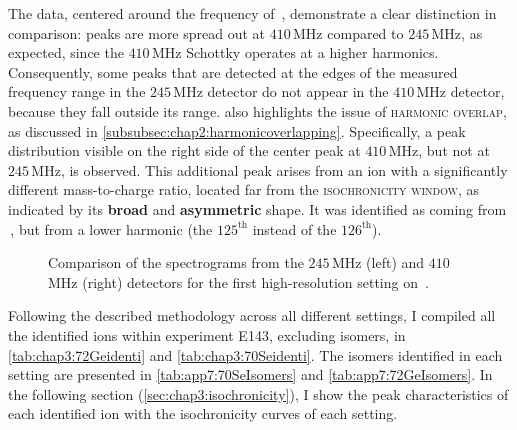 The data, centered around the frequency of \,, demonstrate a clear distinction in comparison: peaks are more spread out at $410$\,MHz compared to $245$\,MHz, as expected, since the $410$\,MHz Schottky operates at a higher harmonics. Consequently, some peaks that are detected at the edges of the measured frequency range in the $245$\,MHz detector do not appear in the $410$\,MHz detector, because they fall outside its range. 
 also highlights the issue of \textsc{harmonic overlap}, as discussed in \cref{subsubsec:chap2:harmonicoverlapping}.
Specifically, a peak distribution visible on the right side of the center peak at $410$\,MHz, but not at $245$\,MHz, is observed. This additional peak arises from an ion with a significantly different mass-to-charge ratio, located far from the \textsc{isochronicity window}, as indicated by its \textbf{broad} and \textbf{asymmetric} shape. It was identified as coming from \,, but from a lower harmonic (the $125^{\mathrm{th}}$ instead of the $126^{\mathrm{th}}$).

\begin{figure}[hbt]
  \centering
  \hspace{0.1cm}
  \caption{Comparison of the spectrograms from the $245$\,MHz (left) and $410$\,MHz (right) detectors for the first high-resolution setting on \,.}
  \label{fig:chap3:410vs245sum}
\end{figure}

Following the described methodology across all different settings, I compiled all the identified ions within experiment \textsc{E143}, excluding isomers, in \cref{tab:chap3:72Geidenti} and \cref{tab:chap3:70Seidenti}. The isomers identified in each setting are presented in \cref{tab:app7:70SeIsomers} and \cref{tab:app7:72GeIsomers}. 
In the following section (\cref{sec:chap3:isochronicity}), I show the peak characteristics of each identified ion with the isochronicity curves of each setting.

